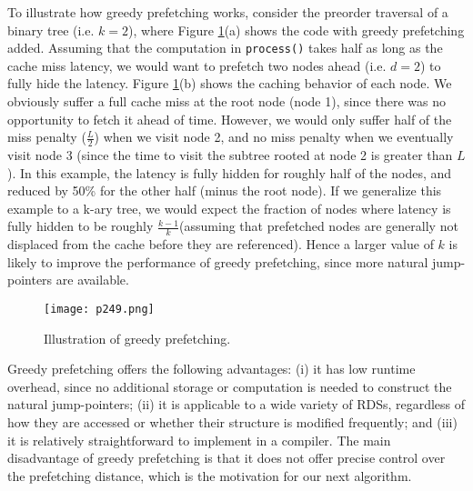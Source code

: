 To illustrate how greedy prefetching works, consider the preorder
traversal of a binary tree (i.e. $k = 2$), where Figure \ref{fig:p249}(a)
shows the code with greedy prefetching added. Assuming that
the computation in \texttt{process()} takes half as long as the cache
miss latency, we would want to prefetch two nodes ahead (i.e.
$d = 2$) to fully hide the latency. Figure \ref{fig:p249}(b) shows the caching
behavior of each node. We obviously suffer a full cache miss at
the root node (node 1), since there was no opportunity to fetch
it ahead of time. However, we would only suffer half of the miss
penalty ($\frac{L}{2}$) when we visit node 2, and no miss penalty when
we eventually visit node 3 (since the time to visit the subtree
rooted at node 2 is greater than $L$). In this example, the latency
is fully hidden for roughly half of the nodes, and reduced by
50\% for the other half (minus the root node). If we generalize
this example to a k-ary tree, we would expect the fraction of
nodes where latency is fully hidden to be roughly $\frac{k-1}{k}$(assuming
that prefetched nodes are generally not displaced from the cache
before they are referenced). Hence a larger value of $k$ is likely
to improve the performance of greedy prefetching, since more
natural jump-pointers are available.


\begin{figure}[H]
    \centering
    \texttt{[image: p249.png]}
    \caption{Illustration of greedy prefetching.  }
    \label{fig:p249}
\end{figure}


Greedy prefetching offers the following advantages:
(i) it has
low runtime overhead, since no additional storage or computation is needed to construct the natural jump-pointers;
(ii) it is
applicable to a wide variety of RDSs, regardless of how they are
accessed or whether their structure is modified frequently; and
(iii) it is relatively straightforward to implement in a compiler. The main disadvantage of greedy prefetching is that it does not offer precise control over the prefetching
distance, which is the motivation for our next algorithm.


